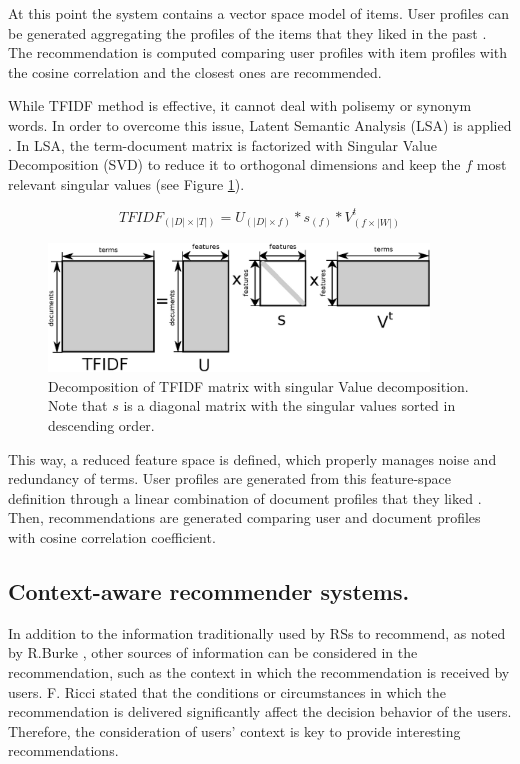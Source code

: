 \documentclass[preprint]{elsarticle}
\begin{document}
\begin{spacing}{1.5}
At this point the system contains a vector space model of items. User profiles can be generated aggregating the profiles of the items that they liked in the past \cite{Symeonidis2007}. The recommendation is computed comparing user profiles with item profiles with the cosine correlation and the closest ones are recommended. 

While TFIDF method is effective, it cannot deal with polisemy or synonym words. In order to overcome this issue, Latent Semantic Analysis (LSA) is applied \cite{deGemmis2015}. In LSA, the term-document matrix is factorized with Singular Value Decomposition (SVD) to reduce it to orthogonal dimensions and keep the $f$ most relevant singular values (see Figure \ref{fig:svd-scheme}).

\begin{equation}
	TFIDF_{(|D|\times|T|)} = U_{(|D|\times f)} * s_{(f)} * V^t_{(f \times |W|)}
	\label{eq:svd}
\end{equation}

\begin{figure}[h]
	\centering
	\includegraphics[width=0.9\textwidth]{figures/svd-scheme.eps}
	\caption{Decomposition of TFIDF matrix with singular Value decomposition. Note that $s$ is a diagonal matrix with the singular values sorted in descending order.}
	\label{fig:svd-scheme}
\end{figure}

This way, a reduced feature space is defined, which properly manages noise and redundancy of terms. User profiles are generated from this feature-space definition through a linear combination of document profiles that they liked \cite{Bambini2011}. Then, recommendations are generated comparing user and document profiles with cosine correlation coefficient.

\subsection{Context-aware recommender systems.}

In addition to the information traditionally used by RSs to recommend, as noted by R.Burke \cite{Burke2002}, other sources of information can be considered in the recommendation, such as the context in which the recommendation is received by users. F. Ricci \cite{Ricci2012contextualizing} stated that the conditions or circumstances in which the recommendation is delivered significantly affect the decision behavior of the users. Therefore, the consideration of users' context is key to provide interesting recommendations.


\end{spacing}
\end{document}
